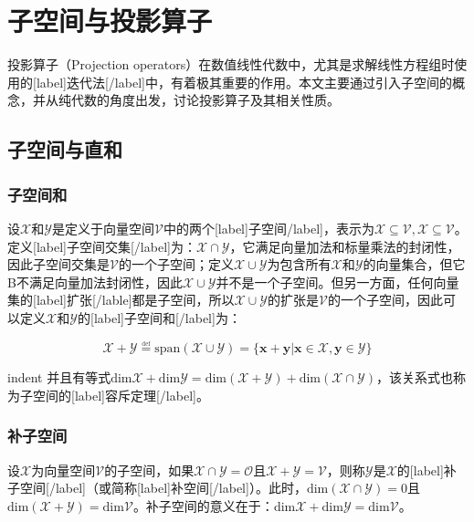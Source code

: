 \documentclass[UTF8,nofonts]{ctexart}
\begin{document}
\section*{子空间与投影算子}

投影算子（Projection operators）在数值线性代数中，尤其是求解线性方程组时使用的[label]迭代法[/label]中，有着极其重要的作用。本文主要通过引入子空间的概念，并从纯代数的角度出发，讨论投影算子及其相关性质。

\subsection*{子空间与直和}

\subsubsection*{子空间和}

设$\mathcal{X}$和$\mathcal{Y}$是定义于向量空间$\mathcal{V}$中的两个[label]子空间/label]，表示为$\mathcal{X}\subseteq\mathcal{V},\mathcal{X}\subseteq\mathcal{V}$。定义[label]子空间交集[/label]为：$\mathcal{X}\cap\mathcal{Y}$，它满足向量加法和标量乘法的封闭性，因此子空间交集是$\mathcal{V}$的一个子空间；定义$\mathcal{X}\cup\mathcal{Y}$为包含所有$\mathcal{X}$和$\mathcal{Y}$的向量集合，但它B不满足向量加法封闭性，因此$\mathcal{X}\cup\mathcal{Y}$并不是一个子空间。但另一方面，任何向量集的[label]扩张[/lable]都是子空间，所以$\mathcal{X}\cup\mathcal{Y}$的扩张是$\mathcal{V}$的一个子空间，因此可以定义$\mathcal{X}$和$\mathcal{Y}$的[label]子空间和[/label]为：

\[
\mathcal{X}+\mathcal{Y}\overset{\underset{\mathrm{def}}{}}{=}\mathrm{span}(\mathcal{X}\cup\mathcal{Y})=\big\{\boldsymbol{x}+\boldsymbol{y}|\boldsymbol{x}\in\mathcal{X},\boldsymbol{y}\in\mathcal{Y}\big\}
\]

indent 并且有等式$\text{dim}\mathcal{X}+\text{dim}\mathcal{Y}=\text{dim}(\mathcal{X}+\mathcal{Y})+\text{dim}(\mathcal{X}\cap\mathcal{Y})$，该关系式也称为子空间的[label]容斥定理[/label]。

\subsubsection*{补子空间}

设$\mathcal{X}$为向量空间$\mathcal{V}$的子空间，如果$\mathcal{X}\cap\mathcal{Y}=\mathcal{O}$且$\mathcal{X}+\mathcal{Y}=\mathcal{V}$，则称$\mathcal{Y}$是$\mathcal{X}$的[label]补子空间[/label]（或简称[label]补空间[/label]）。此时，$\text{dim}(\mathcal{X}\cap\mathcal{Y})=0$且$\text{dim}(\mathcal{X}+\mathcal{Y})=\text{dim}\mathcal{V}$。补子空间的意义在于：$\text{dim}\mathcal{X}+\text{dim}\mathcal{Y}=\text{dim}\mathcal{V}$。
\end{document}
